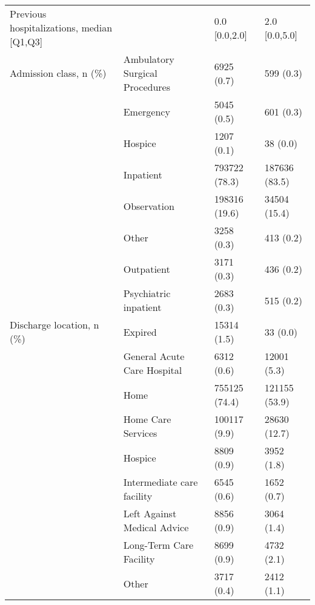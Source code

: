 \begin{tabular}{llll}
Previous hospitalizations, median [Q1,Q3] &   &                  0.0 [0.0,2.0] &     2.0 [0.0,5.0] \\
Admission class, n (\%) & Ambulatory Surgical Procedures &                     6925 (0.7) &         599 (0.3) \\
                                       & Emergency &                     5045 (0.5) &         601 (0.3) \\
                                       & Hospice &                     1207 (0.1) &          38 (0.0) \\
                                       & Inpatient &                  793722 (78.3) &     187636 (83.5) \\
                                       & Observation &                  198316 (19.6) &      34504 (15.4) \\
                                       & Other &                     3258 (0.3) &         413 (0.2) \\
                                       & Outpatient &                     3171 (0.3) &         436 (0.2) \\
                                       & Psychiatric inpatient &                     2683 (0.3) &         515 (0.2) \\
Discharge location, n (\%) & Expired &                    15314 (1.5) &          33 (0.0) \\
                                       & General Acute Care Hospital &                     6312 (0.6) &       12001 (5.3) \\
                                       & Home &                  755125 (74.4) &     121155 (53.9) \\
                                       & Home Care Services &                   100117 (9.9) &      28630 (12.7) \\
                                       & Hospice &                     8809 (0.9) &        3952 (1.8) \\
                                       & Intermediate care facility &                     6545 (0.6) &        1652 (0.7) \\
                                       & Left Against Medical Advice &                     8856 (0.9) &        3064 (1.4) \\
                                       & Long-Term Care Facility &                     8699 (0.9) &        4732 (2.1) \\
                                       & Other &                     3717 (0.4) &        2412 (1.1) \\

\end{tabular}
